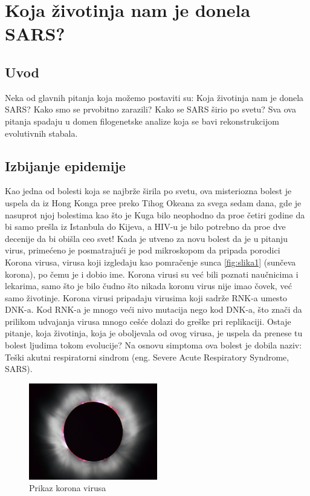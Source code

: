 \chapter{Koja \v{z}ivotinja nam je donela SARS?}
\setbookcodestyle

\section{Uvod}
\label{sec:uvod}

Neka od glavnih pitanja koja mo\v{z}emo postaviti su:
Koja \v{z}ivotinja nam je donela SARS? Kako smo se prvobitno zarazili? Kako se SARS \v{s}irio po svetu? Sva ova pitanja spadaju u domen filogenetske analize koja se bavi rekonstrukcijom evolutivnih stabala.

\section{Izbijanje epidemije}
\label{sec:izbijanjeepidemije}

Kao jedna od bolesti koja se najbr\v{z}e \v{s}irila po svetu, ova misteriozna bolest je uspela da iz Hong Konga pre\dj e preko Tihog Okeana za svega sedam dana, gde je nasuprot njoj bolestima kao \v{s}to je Kuga bilo neophodno da pro\dj e \v{c}etiri godine da bi samo pre\v{s}la iz Istanbula do Kijeva, a HIV-u je bilo potrebno da pro\dj e dve decenije da bi obi\v{s}la ceo svet! Kada je utv\dj eno za novu bolest da je u pitanju virus, prime\'ceno je posmatraju\'ci je pod mikroskopom da pripada porodici Korona virusa, virusa koji izgledaju kao pomra\v{c}enje sunca \ref{fig:slika1} (sun\v{c}eva korona), po \v{c}emu je i dobio ime. Korona virusi su ve\'c bili poznati nau\v{c}nicima i lekarima, samo \v{s}to je bilo \v{c}udno \v{s}to nikada koronu virus nije imao \v{c}ovek, ve\'c samo \v{z}ivotinje. Korona virusi pripadaju virusima koji sadr\v{z}e RNK-a umesto DNK-a. Kod RNK-a je mnogo ve\'ci nivo mutacija nego kod DNK-a, \v{s}to zna\v{c}i da prilikom udvajanja virusa mnogo ce\v{s}\'ce dolazi do gre\v{s}ke pri replikaciji. Ostaje pitanje, koja \v{z}ivotinja, koja je oboljevala od ovog virusa, je uspela da prenese tu bolest ljudima tokom evolucije? Na osnovu simptoma ova bolest je dobila naziv: Te\v{s}ki akutni respiratorni sindrom (eng. Severe Acute Respiratory Syndrome, SARS). 

\begin{figure}[h]
\centering
\includegraphics[width=0.5\textwidth]{poglavlja/7/slike/slika1.png}
\caption{Prikaz korona virusa}
\end{figure} 


